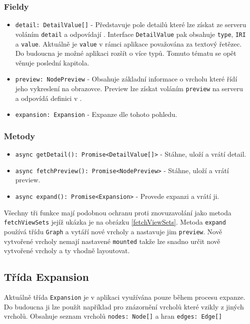 \subsubsection*{Fieldy}
\begin{itemize}
  \item \texttt{detail: DetailValue[]} - Představuje pole detailů které lze získat ze serveru voláním \texttt{detail} a odpovídají \label{pozadavky-detail}. Interface \texttt{DetailValue} pak obsahuje \texttt{type}, \texttt{IRI} a \texttt{value}. Aktuálně je \texttt{value} v rámci aplikace považována za textový řetězec. Do budoucna je možné aplikaci rozšít o více typů. Tomuto tématu se opět věnuje poslední kapitola.
  \item \texttt{preview: NodePreview} - Obsahuje základní informace o vrcholu které řídí jeho vykreslení na obrazovce. Preview lze získat voláním \texttt{preview} na serveru a odpovídá definici v \label{pozadavky-preview}.
  \item \texttt{expansion: Expansion} - Expanze dle tohoto pohledu.
\end{itemize}

\subsubsection*{Metody}
\begin{itemize}
  \item \texttt{async getDetail(): Promise<DetailValue[]>} - Stáhne, uloží a vrátí detail.
  \item \texttt{async fetchPreview(): Promise<NodePreview>} - Stáhne, uloží a vrátí preview.
  \item \texttt{async expand(): Promise<Expansion>} - Provede expanzi a vrátí ji.
\end{itemize}

Všechny tři funkce mají podobnou ochranu proti znovuzavolání jako metoda \texttt{fetchViewSets} jejíž ukázka je na obrázku \ref{fetchViewSets}. Metoda \texttt{expand} používá třídu \texttt{Graph} a vytáří nové vrcholy a nastavuje jim \texttt{preview}. Nově vytvořené vrcholy nemají nastavené \texttt{mounted} takže lze snadno určit nově vytvořené vrcholy a ty vhodně layoutovat.

\subsection{Třída Expansion}
Aktuálně třída \texttt{Expansion} je v aplikaci využívána pouze během procesu expanze. Do budoucna ji lze použít například pro znázornění vrcholů které vzikly z jiných vrcholů. Obsahuje seznam vrcholů \texttt{nodes: Node[]} a hran \texttt{edges: Edge[]}

